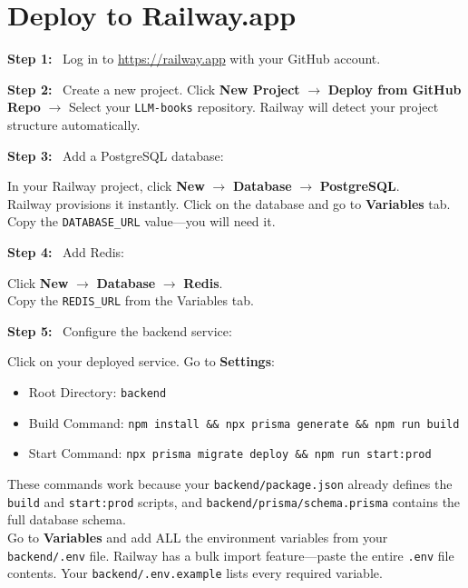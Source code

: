 \documentclass[12pt, letterpaper, oneside]{book}
\newcommand{\step}[1]{\noindent\textbf{\textcolor{primary}{Step #1:}}~}
\begin{document}
\section{Deploy to Railway.app}

\step{1} Log in to \url{https://railway.app} with your GitHub account.

\step{2} Create a new project. Click \textbf{New Project} $\rightarrow$ \textbf{Deploy from GitHub Repo} $\rightarrow$ Select your \texttt{LLM-books} repository. Railway will detect your project structure automatically.

\step{3} Add a PostgreSQL database:
\begin{actionbox}
In your Railway project, click \textbf{New} $\rightarrow$ \textbf{Database} $\rightarrow$ \textbf{PostgreSQL}.\\
Railway provisions it instantly. Click on the database and go to \textbf{Variables} tab. Copy the \texttt{DATABASE\_URL} value---you will need it.
\end{actionbox}

\step{4} Add Redis:
\begin{actionbox}
Click \textbf{New} $\rightarrow$ \textbf{Database} $\rightarrow$ \textbf{Redis}.\\
Copy the \texttt{REDIS\_URL} from the Variables tab.
\end{actionbox}

\step{5} Configure the backend service:
\begin{actionbox}
Click on your deployed service. Go to \textbf{Settings}:
\begin{itemize}[leftmargin=1.5em]
  \item Root Directory: \texttt{backend}
  \item Build Command: \texttt{npm install \&\& npx prisma generate \&\& npm run build}
  \item Start Command: \texttt{npx prisma migrate deploy \&\& npm run start:prod}
\end{itemize}
These commands work because your \texttt{backend/package.json} already defines the \texttt{build} and \texttt{start:prod} scripts, and \texttt{backend/prisma/schema.prisma} contains the full database schema.\\[4pt]
Go to \textbf{Variables} and add ALL the environment variables from your \texttt{backend/.env} file. Railway has a bulk import feature---paste the entire \texttt{.env} file contents. Your \texttt{backend/.env.example} lists every required variable.
\end{actionbox}
\end{document}
